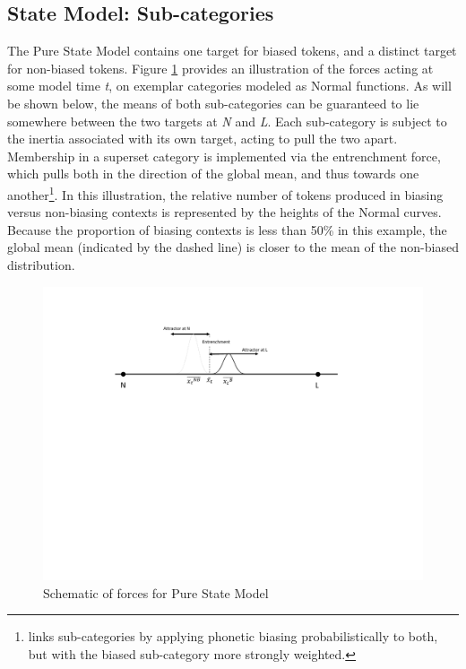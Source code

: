 \subsection{\label{subsec:Lengthening-as-State}State Model: Sub-categories}

The Pure State Model contains one target for biased tokens, and a
distinct target for non-biased tokens. Figure \ref{fig:Model G} provides
an illustration of the forces acting at some model time \emph{t},
on exemplar categories modeled as Normal functions. As will be shown
below, the means of both sub-categories can be guaranteed to lie somewhere
between the two targets at \emph{N} and \emph{L}. Each sub-category
is subject to the inertia associated with its own target, acting to
pull the two apart. Membership in a superset category is implemented
via the entrenchment force, which pulls both in the direction of the
global mean, and thus towards one another\footnote{\citet{soskuthy2013phonetic} links sub-categories by applying phonetic
biasing probabilistically to both, but with the biased sub-category
more strongly weighted. }. In this illustration, the relative number of tokens produced in
biasing versus non-biasing contexts is represented by the heights
of the Normal curves. Because the proportion of biasing contexts is
less than 50\% in this example, the global mean (indicated by the
dashed line) is closer to the mean of the non-biased distribution. 

\begin{figure}[H]
\begin{centering}
\includegraphics[width=.75\textwidth]{figures/Model6Behavior.pdf}\caption{\label{fig:Model G}Schematic of forces for Pure State Model}
\par\end{centering}
\end{figure}

